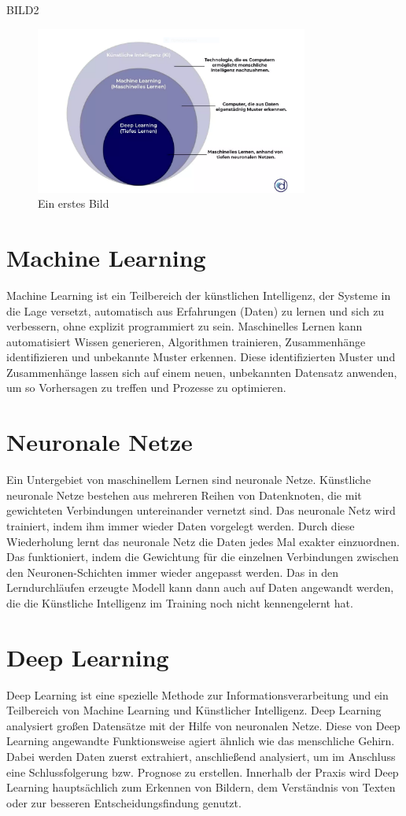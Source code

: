 \documentclass{report}
\begin{document}
 BILD2 \begin{figure}[h]
    \centering 
    \includegraphics[width=0.8\textwidth]{ki-bestandtt.png} 
    \caption{Ein erstes Bild}
    \end{figure}

 \section{Machine Learning}
 Machine Learning ist ein Teilbereich der künstlichen Intelligenz, der Systeme in die Lage versetzt, automatisch 
 aus Erfahrungen (Daten) zu lernen und sich zu verbessern, ohne explizit programmiert zu sein.
 Maschinelles Lernen kann automatisiert Wissen generieren, Algorithmen trainieren, Zusammenhänge identifizieren und unbekannte Muster erkennen. 
 Diese identifizierten Muster und Zusammenhänge lassen sich auf einem neuen, unbekannten Datensatz anwenden, 
 um so Vorhersagen zu treffen und Prozesse zu optimieren.

\section{Neuronale Netze}
 Ein Untergebiet von maschinellem Lernen sind neuronale Netze. Künstliche neuronale Netze bestehen aus mehreren Reihen von Datenknoten, 
 die mit gewichteten Verbindungen untereinander vernetzt sind.
Das neuronale Netz wird trainiert, indem ihm immer wieder Daten vorgelegt werden. Durch diese Wiederholung lernt
das neuronale Netz die Daten jedes Mal exakter einzuordnen. Das funktioniert, indem die Gewichtung für die einzelnen Verbindungen
 zwischen den Neuronen-Schichten immer wieder angepasst werden. Das in den Lerndurchläufen 
erzeugte Modell kann dann auch auf Daten angewandt werden, die die Künstliche Intelligenz im Training noch nicht kennengelernt hat.


 \section{Deep Learning} 
 Deep Learning ist eine spezielle Methode zur Informationsverarbeitung und ein Teilbereich von Machine Learning und Künstlicher 
 Intelligenz. Deep Learning analysiert großen Datensätze mit der Hilfe von neuronalen Netze. Diese von Deep Learning angewandte Funktionsweise
  agiert ähnlich wie das menschliche Gehirn. Dabei werden Daten zuerst extrahiert, anschließend analysiert, um im Anschluss eine 
  Schlussfolgerung bzw. Prognose zu erstellen. Innerhalb der Praxis wird Deep Learning hauptsächlich zum Erkennen von Bildern,
   dem Verständnis von Texten oder zur besseren Entscheidungsfindung genutzt. 
\end{document}
